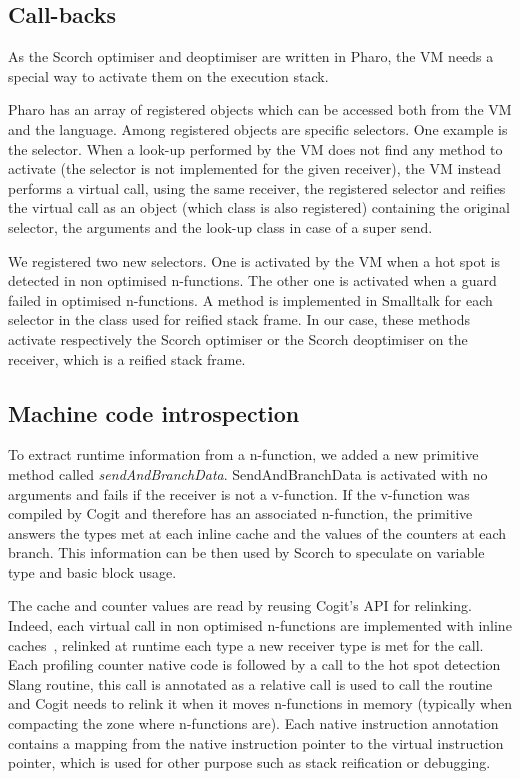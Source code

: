 \documentclass[a4paper,12pt,twoside]{../includes/ThesisStyle}
\begin{document}
\subsection{Call-backs}

As the Scorch optimiser and deoptimiser are written in Pharo, the VM needs a special way to activate them on the execution stack. 

Pharo has an array of registered objects which can be accessed both from the VM and the language. Among registered objects are specific selectors. One example is the  selector. When a look-up performed by the VM does not find any method to activate (the selector is not implemented for the given receiver), the VM instead performs a virtual call, using the same receiver, the registered  selector and reifies the virtual call as an object (which class is also registered) containing the original selector, the arguments and the look-up class in case of a super send. 

We registered two new selectors. One is activated by the VM when a hot spot is detected in non optimised n-functions. The other one is activated when a guard failed in optimised n-functions. A method is implemented in Smalltalk for each selector in the class used for reified stack frame. In our case, these methods activate respectively the Scorch optimiser or the Scorch deoptimiser on the receiver, which is a reified stack frame.

\subsection{Machine code introspection}

To extract runtime information from a n-function, we added a new primitive method called \emph{sendAndBranchData}. SendAndBranchData is activated with no arguments and fails if the receiver is not a v-function. If the v-function was compiled by Cogit and therefore has an associated n-function, the primitive answers the types met at each inline cache and the values of the counters at each branch. This information can be then used by Scorch to speculate on variable type and basic block usage. 

The cache and counter values are read by reusing Cogit's API for relinking. Indeed, each virtual call in non optimised n-functions are implemented with inline caches~\cite{Deut84a,Holz91a}, relinked at runtime each type a new receiver type is met for the call. Each profiling counter native code is followed by a call to the hot spot detection Slang routine, this call is annotated as a relative call is used to call the routine and Cogit needs to relink it when it moves n-functions in memory (typically when compacting the zone where n-functions are). Each native instruction annotation contains a mapping from the native instruction pointer to the virtual instruction pointer, which is used for other purpose such as stack reification or debugging.
\end{document}
